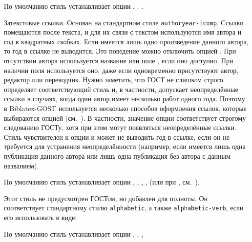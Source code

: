 \documentclass[10pt,a4paper,headings=small,numbers=enddot,english,russian]{ltxdockit}[2011/03/25]
\newcommand*{\biblatexgost}{Biblatex-GOST\xspace}
\newcommand*{\bibsty}{\texttt}
\begin{document}
\begin{marglist}
По умолчанию стиль устанавливает опции , .
.

\item[gost-authoryear]
Затекстовые ссылки. Основан на стандартном
стиле \bibsty{authoryear-icomp}. Ссылки помещаются после текста, и для их связи
с текстом используются имя автора и год в квадратных скобках. Если имеется лишь одно
произведение данного автора, то год в ссылке не выводится. Это поведение можно
отключить опцией . При отсутствии автора
используется название или поле , если оно доступно.
При наличии поля  используется оно, даже если одновременно присутствуют
автор, редактор или переводчик. Нужно заметить, что ГОСТ
не слишком строго определяет соответствующий стиль и, в частности, допускает неопределённые
ссылки в случаях, когда один автор имеет несколько
работ одного года. Поэтому в \biblatexgost используется несколько способов оформления
ссылок, которые выбираются опцией  (см.~).
В частности, значение опции  соответствует строгому
следованию ГОСТу, хотя при этом могут появляться неопределённые ссылки.
Стиль чувствителен к опции  и может не выводить год в ссылке, если он
не требуется для устранения неопределённости (например, если имеется лишь одна публикация
данного автора или лишь одна публикация без автора с данным названием).

По умолчанию стиль устанавливает опции
,
,
,
,
 (или  при ,
см.~).

\item[gost-alphabetic]
Этот стиль не предусмотрен ГОСТом, но добавлен для полноты. Он соответствует стандартному
стилю \bibsty{alphabetic}, а также \bibsty{alphabetic-verb}, если его использовать в виде:

\begin{ltxcode}
\usepackage[%
    citestyle=alphabetic-verb,
    bibstyle=gost-alphabetic,
    ...
]{biblatex}
\end{ltxcode}

По умолчанию стиль устанавливает опции
,
,
,


\end{marglist}
\end{document}
